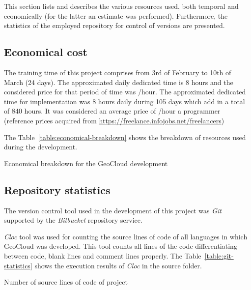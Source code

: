 This section lists and describes the various resources used, both temporal 
and economically (for the latter an estimate was performed). Furthermore, the
statistics of the employed repository for control of versions are presented.

\subsection{Economical cost}

The training time of this project comprises from 3rd of February to 10th of
March (24 days). The approximated daily dedicated time is 8 hours and the considered price for that period of time was /hour. The approximated dedicated time for implementation was 8 hours daily
during 105 days which add in a total of 840 hours. It was considered an average
price of /hour a programmer (reference prices acquired from
\url{https://freelance.infojobs.net/freelancers})

The Table~\ref{table:economical-breakdown} shows the breakdown of resources used during the development.


\begin{table}[hp]
  \centering
  {\small
  
  }
  \caption{Economical breakdown for the GeoCloud development}
  \label{table:economical-breakdown}
\end{table}

\subsection{Repository statistics}

The version control tool used in the development of this project was \emph{Git}
supported by the \emph{Bitbucket} repository service.

\emph{Cloc} tool was used for counting the source lines of code of all languages in which
GeoCloud was developed. This tool counts all lines of the code differentiating
between code, blank lines and comment lines properly. The Table~\ref{table:git-statistics} shows the
execution results of \emph{Cloc} in the source folder.

\begin{table}[hp]
  \centering
  {\small
  
  }
  \caption{Number of source lines of code of project}
  \label{table:git-statistics}
\end{table}
